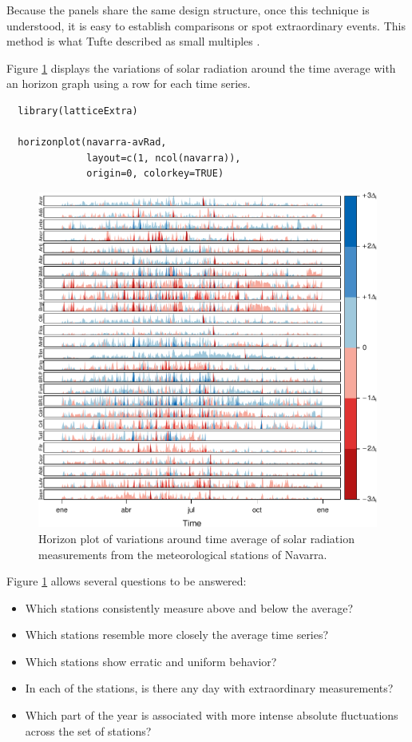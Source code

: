 \documentclass[smallroyalvopaper]{memoir}
\begin{document}
Because the panels share the same design structure, once this
technique is understood, it is easy to establish comparisons or spot
extraordinary events.  This method is what Tufte described as small
multiples \cite{Tufte1990}.

Figure \ref{fig:navarraHorizonplot} displays the variations of
solar radiation around the time average with an horizon graph
using a row for each time series.


\lstset{language=r,label= ,caption= ,captionpos=b,numbers=none}
\begin{lstlisting}
  library(latticeExtra)
  
  horizonplot(navarra-avRad,
              layout=c(1, ncol(navarra)),
              origin=0, colorkey=TRUE)
\end{lstlisting}

\begin{figure}[htbp]
\centering
\includegraphics[width=.9\linewidth]{figs/navarraHorizonplot.pdf}
\caption{Horizon plot of variations around time average of solar radiation measurements from the meteorological stations of Navarra. \label{fig:navarraHorizonplot}}
\end{figure}

Figure \ref{fig:navarraHorizonplot} allows several questions to be
answered:
\begin{itemize}
\item Which stations consistently measure above and below the average?
\item Which stations resemble more closely the average time series?
\item Which stations show erratic and uniform behavior?
\item In each of the stations, is there any day with extraordinary measurements?
\item Which part of the year is associated with more intense
absolute fluctuations across the set of stations?
\end{itemize}
\end{document}
